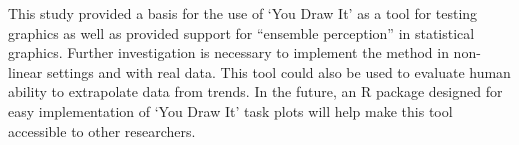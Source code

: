 \documentclass[12pt]{article}
\begin{document}
This study provided a basis for the use of `You Draw It' as a tool for
testing graphics as well as provided support for ``ensemble perception''
in statistical graphics. Further investigation is necessary to implement
the method in non-linear settings and with real data. This tool could
also be used to evaluate human ability to extrapolate data from trends.
In the future, an R package designed for easy implementation of `You
Draw It' task plots will help make this tool accessible to other
researchers.



\end{document}
